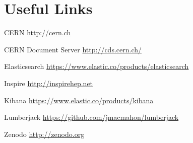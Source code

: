 \documentclass[a4paper,11pt]{article} %
\begin{document}
\section{Useful Links}
\label{sec:references}

\begin{description*}
  \item[CERN] \url{http://cern.ch}
  \item[CERN Document Server] \url{http://cds.cern.ch/}
  \item[Elasticsearch] \url{https://www.elastic.co/products/elasticsearch}
  \item[Inspire] \url{http://inspirehep.net}
  \item[Kibana] \url{https://www.elastic.co/products/kibana}
  \item[Lumberjack] \url{https://github.com/jmacmahon/lumberjack}
  \item[Zenodo] \url{http://zenodo.org}
\end{description*}
\end{document}
